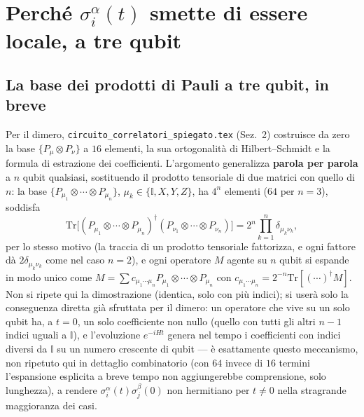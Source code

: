 \documentclass[11pt,a4paper]{article}
\begin{document}
\section{Perché \texorpdfstring{$\sigma_i^\alpha(t)$}{sigma\_i\^{}alpha(t)} smette di essere locale, a tre qubit}
\label{sec:spalmamento}

\subsection{La base dei prodotti di Pauli a tre qubit, in breve}

Per il dimero, \texttt{circuito\_correlatori\_spiegato.tex} (Sez.~2) costruisce da zero la base
$\{P_\mu\otimes P_\nu\}$ a $16$ elementi, la sua ortogonalità di Hilbert--Schmidt e la formula di
estrazione dei coefficienti. L'argomento generalizza \textbf{parola per parola} a $n$ qubit
qualsiasi, sostituendo il prodotto tensoriale di due matrici con quello di $n$: la base
$\{P_{\mu_1}\otimes\cdots\otimes P_{\mu_n}\}$, $\mu_k\in\{\mathbb I,X,Y,Z\}$, ha $4^n$ elementi
($64$ per $n=3$), soddisfa
\begin{equation}
\mathrm{Tr}\big[(P_{\mu_1}\!\otimes\!\cdots\!\otimes\! P_{\mu_n})^\dagger
(P_{\nu_1}\!\otimes\!\cdots\!\otimes\! P_{\nu_n})\big]=2^n\prod_{k=1}^n\delta_{\mu_k\nu_k},
\label{eq:ortogN}
\end{equation}
per lo stesso motivo (la traccia di un prodotto tensoriale fattorizza, e ogni fattore dà
$2\delta_{\mu_k\nu_k}$ come nel caso $n=2$), e ogni operatore $M$ agente su $n$ qubit si espande
in modo unico come $M=\sum c_{\mu_1\cdots\mu_n}P_{\mu_1}\otimes\cdots\otimes P_{\mu_n}$ con
$c_{\mu_1\cdots\mu_n}=2^{-n}\mathrm{Tr}[(\cdots)^\dagger M]$. Non si ripete qui la dimostrazione
(identica, solo con più indici); si userà solo la conseguenza diretta già sfruttata per il
dimero: un operatore che vive su un solo qubit ha, a $t=0$, un solo coefficiente non nullo (quello
con tutti gli altri $n-1$ indici uguali a $\mathbb I$), e l'evoluzione $e^{-iHt}$ genera nel
tempo i coefficienti con indici diversi da $\mathbb I$ su un numero crescente di qubit --- è
esattamente questo meccanismo, non ripetuto qui in dettaglio combinatorio (con $64$ invece di
$16$ termini l'espansione esplicita a breve tempo non aggiungerebbe comprensione, solo lunghezza),
a rendere $\sigma_i^\alpha(t)\sigma_j^\beta(0)$ non hermitiano per $t\neq0$ nella stragrande
maggioranza dei casi.
\end{document}
